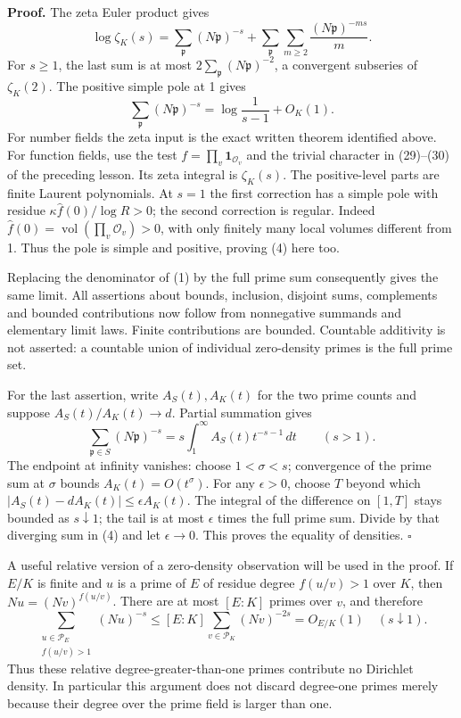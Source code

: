 \documentclass[11pt,a4paper]{article}
\begin{document}
\textbf{Proof.} The zeta Euler product gives \[
\log\zeta_K(s)=\sum_{\mathfrak p}(N\mathfrak p)^{-s}
 +\sum_{\mathfrak p}\sum_{m\geq2}\frac{(N\mathfrak p)^{-ms}}m.
\tag{3}
\] For \(s\geq1\), the last sum is at most
\(2\sum_{\mathfrak p}(N\mathfrak p)^{-2}\), a convergent subseries of
\(\zeta_K(2)\). The positive simple pole at 1 gives \[
\sum_{\mathfrak p}(N\mathfrak p)^{-s}
=\log\frac1{s-1}+O_K(1).
\tag{4}
\] For number fields the zeta input is the exact written theorem
identified above. For function fields, use the test
\(f=\prod_v\mathbf1_{\mathcal O_v}\) and the trivial character in
(29)--(30) of the preceding lesson. Its zeta integral is \(\zeta_K(s)\).
The positive-level parts are finite Laurent polynomials. At \(s=1\) the
first correction has a simple pole with residue
\(\kappa\widehat f(0)/\log R>0\); the second correction is regular.
Indeed \(\widehat f(0)=\operatorname{vol}(\prod_v\mathcal O_v)>0\), with
only finitely many local volumes different from 1. Thus the pole is
simple and positive, proving (4) here too.

Replacing the denominator of (1) by the full prime sum consequently
gives the same limit. All assertions about bounds, inclusion, disjoint
sums, complements and bounded contributions now follow from nonnegative
summands and elementary limit laws. Finite contributions are bounded.
Countable additivity is not asserted: a countable union of individual
zero-density primes is the full prime set.

For the last assertion, write \(A_S(t),A_K(t)\) for the two prime counts
and suppose \(A_S(t)/A_K(t)\to d\). Partial summation gives \[
\sum_{\mathfrak p\in S}(N\mathfrak p)^{-s}
=s\int_1^\infty A_S(t)t^{-s-1}\,dt
\qquad(s>1).
\tag{5}
\] The endpoint at infinity vanishes: choose \(1<\sigma<s\); convergence
of the prime sum at \(\sigma\) bounds \(A_K(t)=O(t^\sigma)\). For any
\(\epsilon>0\), choose \(T\) beyond which
\(|A_S(t)-dA_K(t)|\leq\epsilon A_K(t)\). The integral of the difference
on \([1,T]\) stays bounded as \(s\downarrow1\); the tail is at most
\(\epsilon\) times the full prime sum. Divide by that diverging sum in
(4) and let \(\epsilon\to0\). This proves the equality of densities.
\(\square\)

A useful relative version of a zero-density observation will be used in
the proof. If \(E/K\) is finite and \(u\) is a prime of \(E\) of residue
degree \(f(u/v)>1\) over \(K\), then \(Nu=(Nv)^{f(u/v)}\). There are at
most \([E:K]\) primes over \(v\), and therefore \[
\sum_{\substack{u\in\mathcal P_E\\f(u/v)>1}}(Nu)^{-s}
\leq[E:K]\sum_{v\in\mathcal P_K}(Nv)^{-2s}=O_{E/K}(1)
\quad(s\downarrow1).
\tag{6}
\] Thus these relative degree-greater-than-one primes contribute no
Dirichlet density. In particular this argument does not discard
degree-one primes merely because their degree over the prime field is
larger than one.
\end{document}
